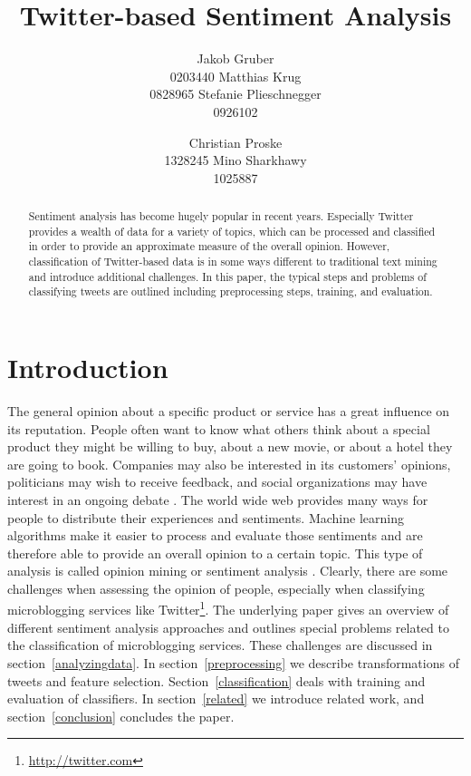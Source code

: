 \documentclass{acm_proc_article-sp}
\title{Twitter-based Sentiment Analysis}
\author{
\alignauthor Jakob Gruber\\
      0203440
\alignauthor Matthias Krug\\
      0828965
\alignauthor Stefanie Plieschnegger\\
      0926102
\and
\alignauthor Christian Proske\\
      1328245
\alignauthor Mino Sharkhawy\\
      1025887
}
\begin{document}
\maketitle

\begin{abstract} Sentiment analysis has become hugely popular in recent years.
    Especially Twitter provides a wealth of data for a variety of topics, which
    can be processed and classified in order to provide an approximate measure of
    the overall opinion. However,
    classification of Twitter-based data is in some ways different to traditional
    text mining and introduce additional challenges. In this paper, the
    typical steps and problems of classifying tweets are outlined including
    preprocessing steps, training, and evaluation.
\end{abstract}



\section{Introduction}

The general opinion about a specific product or service
has a great influence on its reputation. People often want to know
what others think about a special product they might be willing to buy, about a new
movie, or about a hotel they are going to book. Companies may also be
interested in its customers' opinions, politicians may wish to receive
feedback, and social organizations may have interest in an ongoing debate \cite{pak2010twitter}.
The world wide web provides many ways for people to
distribute their experiences and sentiments. Machine learning algorithms make
it easier to process and evaluate those sentiments and are therefore able to
provide an overall opinion to a certain topic. This type of analysis is called
opinion mining or sentiment analysis \cite{liu2010sentimentanalysis,
pang2008opinion}. Clearly, there are some challenges when assessing the opinion
of people, especially when classifying microblogging services like Twitter\footnote{
\url{http://twitter.com}}. The underlying paper gives an overview
of different sentiment analysis approaches and outlines special problems
related to the classification of microblogging services. These challenges are
discussed in section~\ref{analyzingdata}. In section~\ref{preprocessing} we describe
transformations of tweets and feature selection.
Section~\ref{classification} deals with training and evaluation of classifiers. In
section~\ref{related} we introduce related work, and
section~\ref{conclusion} concludes the paper.
\end{document}
